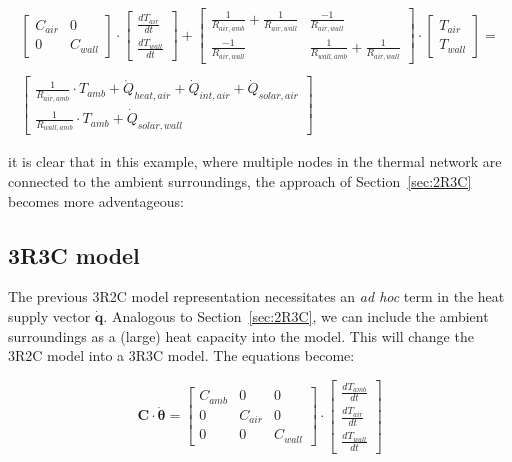 \begin{equation}
	\begin{aligned}
		\begin{bmatrix}
			C_{air} & 0 \\
			0 &  C_{wall}
		\end{bmatrix}
		\cdot
		\begin{bmatrix}
			\frac{dT_{air}}{dt} \\
			\frac{dT_{wall}}{dt}
		\end{bmatrix}
		+
		\begin{bmatrix}
			\frac{1}{R_{air, amb}} + \frac{1}{R_{air, wall}} & \frac{-1}{R_{air, wall}} \\
			\frac{-1}{R_{air, wall}} &  \frac{1}{R_{wall, amb}} + \frac{1}{R_{air, wall}}
		\end{bmatrix}
		\cdot
		\begin{bmatrix}
			T_{air} \\
			T_{wall}
		\end{bmatrix}
		= \\ \\
		\begin{bmatrix}
			\frac{1}{R_{air, amb}} \cdot T_{amb} + \dot{Q}_{heat, air} + \dot{Q}_{int, air} + \dot{Q}_{solar, air} \\
			\frac{1}{R_{wall, amb}} \cdot T_{amb} + \dot{Q}_{solar, wall}
		\end{bmatrix}
	\end{aligned}
\end{equation}

it is clear that in this example, where multiple nodes in the thermal network are connected to the ambient surroundings, the approach of Section~\ref{sec:2R3C} becomes more adventageous:

\subsection{3R3C model}

The previous 3R2C model representation necessitates an \emph{ad hoc} term in the heat supply vector $\mathbf{\dot{q}}$. Analogous to Section~\ref{sec:2R3C}, we can include the ambient surroundings as a (large) heat capacity into the model. This will change the 3R2C model into a 3R3C model. The equations become:

\begin{equation}
	\mathbf{C} \cdot \boldsymbol{\dot{\theta}} =
	\begin{bmatrix}
		C_{amb} & 0 & 0\\
		0 &  C_{air} & 0   \\
		0 & 0 & C_{wall} 
	\end{bmatrix}
	\cdot
	\begin{bmatrix}
		\frac{dT_{amb}}{dt} \\
		\frac{dT_{air}}{dt} \\
		\frac{dT_{wall}}{dt} 
	\end{bmatrix}
\end{equation}


